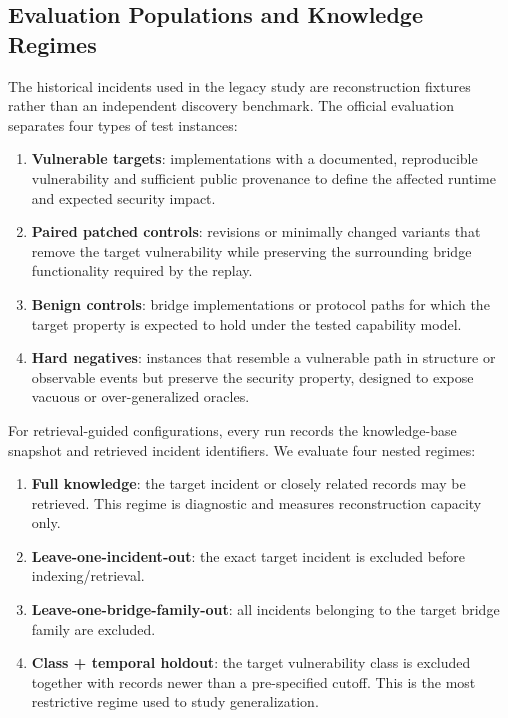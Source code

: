 \subsection{Evaluation Populations and Knowledge Regimes}

The historical incidents used in the legacy study are reconstruction fixtures rather than an independent discovery benchmark. The official evaluation separates four types of test instances:

\begin{enumerate}
    \item \textbf{Vulnerable targets}: implementations with a documented, reproducible vulnerability and sufficient public provenance to define the affected runtime and expected security impact.
    \item \textbf{Paired patched controls}: revisions or minimally changed variants that remove the target vulnerability while preserving the surrounding bridge functionality required by the replay.
    \item \textbf{Benign controls}: bridge implementations or protocol paths for which the target property is expected to hold under the tested capability model.
    \item \textbf{Hard negatives}: instances that resemble a vulnerable path in structure or observable events but preserve the security property, designed to expose vacuous or over-generalized oracles.
\end{enumerate}

For retrieval-guided configurations, every run records the knowledge-base snapshot and retrieved incident identifiers. We evaluate four nested regimes:

\begin{enumerate}
    \item \textbf{Full knowledge}: the target incident or closely related records may be retrieved. This regime is diagnostic and measures reconstruction capacity only.
    \item \textbf{Leave-one-incident-out}: the exact target incident is excluded before indexing/retrieval.
    \item \textbf{Leave-one-bridge-family-out}: all incidents belonging to the target bridge family are excluded.
    \item \textbf{Class + temporal holdout}: the target vulnerability class is excluded together with records newer than a pre-specified cutoff. This is the most restrictive regime used to study generalization.
\end{enumerate}

